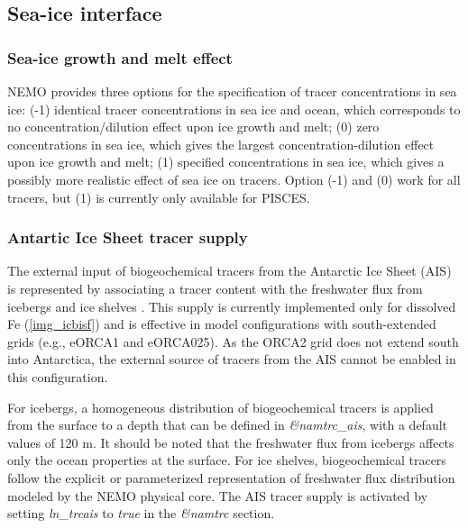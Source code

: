 \documentclass[../main/TOP_manual]{subfiles}
\begin{document}

\subsection{Sea-ice interface}

\subsubsection{Sea-ice growth and melt effect}

NEMO provides three options for the specification of tracer concentrations in sea ice: (-1) identical tracer concentrations in sea ice and ocean, which corresponds to no concentration/dilution effect upon ice growth and melt; (0) zero concentrations in sea ice, which gives the largest concentration-dilution effect upon ice growth and melt; (1) specified concentrations in sea ice, which gives a possibly more realistic effect of sea ice on tracers. Option (-1) and (0) work for all tracers, but (1) is currently only available for PISCES.


\subsubsection{Antartic Ice Sheet tracer supply}

The external input of biogeochemical tracers from the Antarctic Ice Sheet (AIS) is represented by associating a tracer content with the freshwater flux from icebergs and ice shelves \citep{person_sensitivity_2019}. This supply is currently implemented only for dissolved Fe (\autoref{img_icbisf}) and is effective in model configurations with south-extended grids (e.g., eORCA1 and eORCA025). As the ORCA2 grid does not extend south into Antarctica, the external source of tracers from the AIS cannot be enabled in this configuration. 

For icebergs, a homogeneous distribution of biogeochemical tracers is applied from the surface to a depth that can be defined in \textit{\&namtrc\_ais}, with a default values of 120 m. It should be noted that the freshwater flux from icebergs affects only the ocean properties at the surface. For ice shelves, biogeochemical tracers follow the explicit or parameterized representation of freshwater flux distribution modeled by the NEMO physical core. The AIS tracer supply is activated by setting \textit{ln\_trcais} to \textit{true} in the \textit{\&namtrc} section.
\end{document}
